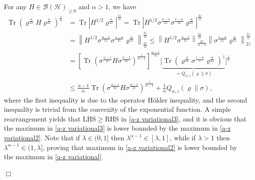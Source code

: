 \documentclass[unsortedaddress,superscriptaddress,pra,notitlepage]{revtex4}
\newenvironment{proof}[1][Proof]{\begin{trivlist}
\item[\hskip \labelsep {\bfseries #1}]}{\hfill$\Box$\end{trivlist}}
\def\B{{\mathcal B}}
\def\rho{\varrho}
\def\hil{{\mathcal H}}
\def\bz{\left(}
\def\jz{\right)}
\def\p{_{\ge 0}}
\newcommand{\norm}[1]{\left\| #1\right\|}
\newcommand{\abs}[1]{\left| #1 \right|}
\DeclareMathOperator{\Tr}{Tr}
\begin{document}
\begin{proof}
For any $H\in\B(\hil)\p$ and $\alpha>1$, we have 
\begin{align*}
\Tr \bz \rho^{\frac{\alpha}{2z}}H\rho^{\frac{\alpha}{2z}}\jz^{\frac{z}{\alpha}}
&=
\Tr\abs{H^{1/2}\rho^{\frac{\alpha}{2z}}}^{\frac{2z}{\alpha}}
=
\Tr\abs{H^{1/2}\sigma^{\frac{\alpha-1}{2z}}\sigma^{\frac{1-\alpha}{2z}}\rho^{\frac{\alpha}{2z}}}^{\frac{2z}{\alpha}}
\\
&=
\norm{H^{1/2}\sigma^{\frac{\alpha-1}{2z}}\sigma^{\frac{1-\alpha}{2z}}\rho^{\frac{\alpha}{2z}}}_{\frac{2z}{\alpha}}^{\frac{2z}{\alpha}}
\le
\norm{H^{1/2}\sigma^{\frac{\alpha-1}{2z}}}_{\frac{2z}{\alpha-1}}^{\frac{2z}{\alpha}}
\norm{\sigma^{\frac{1-\alpha}{2z}}\rho^{\frac{\alpha}{2z}}}_{2z}^{\frac{2z}{\alpha}}
\\
&=
\left[\Tr\bz\sigma^{\frac{\alpha-1}{2z}}H \sigma^{\frac{\alpha-1}{2z}}\jz^{\frac{z}{\alpha-1}}\right]^{\frac{\alpha-1}{\alpha}}
\Bigg[\underbrace{\Tr\bz 
\rho^{\frac{\alpha}{2z}}\sigma^{\frac{1-\alpha}{z}}\rho^{\frac{\alpha}{2z}}\jz^{z}}_{=Q_{\alpha,z}(\rho\|\sigma)}\Bigg]^{\frac{1}{\alpha}}
\\
&\le
\frac{\alpha-1}{\alpha}\Tr\bz\sigma^{\frac{\alpha-1}{2z}}H \sigma^{\frac{\alpha-1}{2z}}\jz^{\frac{z}{\alpha-1}}
+
\frac{1}{\alpha}Q_{\alpha,z}(\rho\|\sigma),%
\end{align*}
where the first inequality is due to the operator H\"older inequality, and 
the second inequality is trivial from the convexity of the exponential function.
A simple rearrangement yields that LHS$\ge$RHS in \eqref{a-z variational3}, and it is 
obvious that the maximum in \eqref{a-z variational3} is lower bounded by the maximum in 
\eqref{a-z variational2}.
Note that if $\lambda\in(0,1]$ then 
$\lambda^{\alpha-1}\in[\lambda,1]$, while if $\lambda>1$ then 
$\lambda^{\alpha-1}\in(1,\lambda]$, proving that 
maximum in \eqref{a-z variational2} is lower bounded by the maximum in 
\eqref{a-z variational}.


\end{proof}
\end{document}
